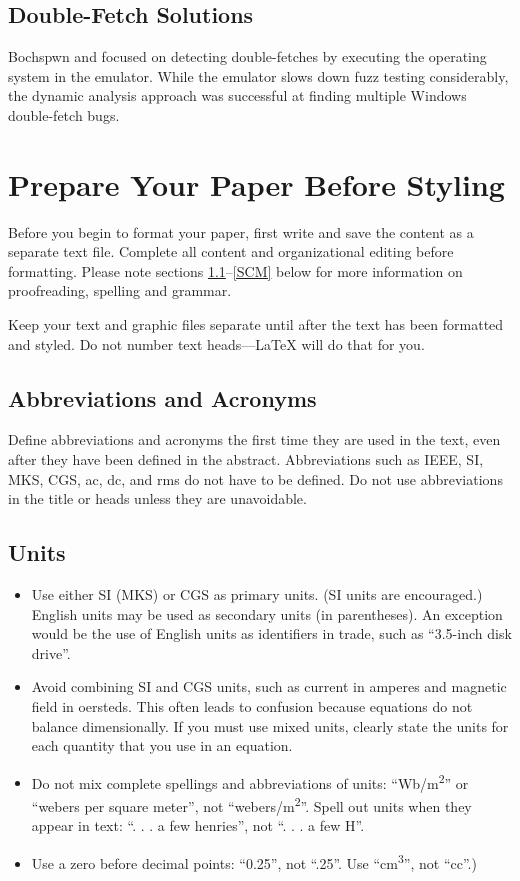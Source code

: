 \documentclass[conference]{IEEEtran}
\begin{document}
\subsection{Double-Fetch Solutions}

Bochspwn and focused on detecting double-fetches by executing the operating system in the emulator. While the emulator slows down fuzz testing considerably,
the dynamic analysis approach was successful at finding multiple Windows double-fetch bugs.


\section{Prepare Your Paper Before Styling}
Before you begin to format your paper, first write and save the content as a 
separate text file. Complete all content and organizational editing before 
formatting. Please note sections \ref{AA}--\ref{SCM} below for more information on 
proofreading, spelling and grammar.

Keep your text and graphic files separate until after the text has been 
formatted and styled. Do not number text heads---{\LaTeX} will do that 
for you.

\subsection{Abbreviations and Acronyms}\label{AA}
Define abbreviations and acronyms the first time they are used in the text, 
even after they have been defined in the abstract. Abbreviations such as 
IEEE, SI, MKS, CGS, ac, dc, and rms do not have to be defined. Do not use 
abbreviations in the title or heads unless they are unavoidable.

\subsection{Units}
\begin{itemize}
\item Use either SI (MKS) or CGS as primary units. (SI units are encouraged.) English units may be used as secondary units (in parentheses). An exception would be the use of English units as identifiers in trade, such as ``3.5-inch disk drive''.
\item Avoid combining SI and CGS units, such as current in amperes and magnetic field in oersteds. This often leads to confusion because equations do not balance dimensionally. If you must use mixed units, clearly state the units for each quantity that you use in an equation.
\item Do not mix complete spellings and abbreviations of units: ``Wb/m\textsuperscript{2}'' or ``webers per square meter'', not ``webers/m\textsuperscript{2}''. Spell out units when they appear in text: ``. . . a few henries'', not ``. . . a few H''.
\item Use a zero before decimal points: ``0.25'', not ``.25''. Use ``cm\textsuperscript{3}'', not ``cc''.)
\end{itemize}
\end{document}
